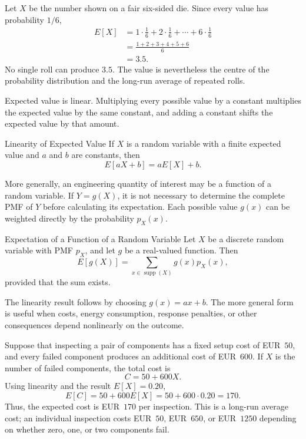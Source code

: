 \begin{example}\par
Let $X$ be the number shown on a fair six-sided die. Since every value has probability $1/6$,
\[
\begin{aligned}
E[X]
&=1\cdot\frac{1}{6}+2\cdot\frac{1}{6}+\cdots+6\cdot\frac{1}{6}\\
&=\frac{1+2+3+4+5+6}{6}\\
&=3.5.
\end{aligned}
\]
No single roll can produce $3.5$. The value is nevertheless the centre of the probability distribution and the long-run average of repeated rolls.
\end{example}

Expected value is linear. Multiplying every possible value by a constant multiplies the expected value by the same constant, and adding a constant shifts the expected value by that amount.

\begin{theorem}{Linearity of Expected Value}
    If $X$ is a random variable with a finite expected value and $a$ and $b$ are constants, then
    \[
    E[aX+b]=aE[X]+b.
    \]
\end{theorem}

More generally, an engineering quantity of interest may be a function of a random variable. If $Y=g(X)$, it is not necessary to determine the complete PMF of $Y$ before calculating its expectation. Each possible value $g(x)$ can be weighted directly by the probability $p_X(x)$.

\begin{theorem}{Expectation of a Function of a Random Variable}
    Let $X$ be a discrete random variable with PMF $p_X$, and let $g$ be a real-valued function. Then
    \[
    E[g(X)]
    =\sum_{x\in\operatorname{supp}(X)}g(x)p_X(x),
    \]
    provided that the sum exists.
\end{theorem}

The linearity result follows by choosing $g(x)=ax+b$. The more general form is useful when costs, energy consumption, response penalties, or other consequences depend nonlinearly on the outcome.

\begin{example}\par
Suppose that inspecting a pair of components has a fixed setup cost of EUR~$50$, and every failed component produces an additional cost of EUR~$600$. If $X$ is the number of failed components, the total cost is
\[
C=50+600X.
\]
Using linearity and the result $E[X]=0.20$,
\[
E[C]
=50+600E[X]
=50+600\cdot0.20
=170.
\]
Thus, the expected cost is EUR~$170$ per inspection. This is a long-run average cost; an individual inspection costs EUR~$50$, EUR~$650$, or EUR~$1250$ depending on whether zero, one, or two components fail.
\end{example}

